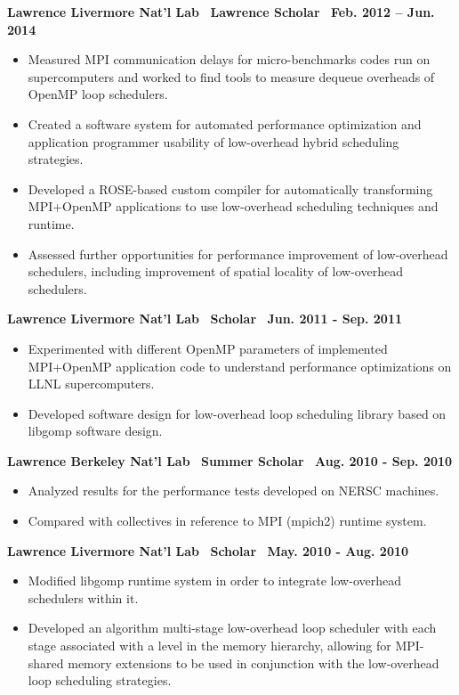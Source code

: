 \textbf{Lawrence Livermore Nat’l Lab$\>$$\>$$\>$$\>$Lawrence Scholar$\>$$\>$$\>$$\>$Feb. 2012 – Jun. 2014}
\vspace*{-0.0in}
\begin{itemize} 
\item Measured MPI communication delays for micro-benchmarks codes run on supercomputers and worked to find tools to measure dequeue overheads of OpenMP loop schedulers.
\item Created a software system for automated performance optimization and application programmer usability of low-overhead hybrid scheduling
strategies.
\item Developed a ROSE-based custom compiler for automatically transforming MPI+OpenMP applications to use low-overhead scheduling
techniques and runtime.
\item Assessed further opportunities for performance improvement of low-overhead schedulers, including improvement of spatial locality
of low-overhead schedulers.
\end{itemize}

\textbf{Lawrence Livermore Nat’l Lab$\>$$\>$$\>$$\>$Scholar$\>$$\>$$\>$$\>$Jun. 2011 - Sep. 2011}
\vspace*{-0.0in}
\begin{itemize} 
\item Experimented with different OpenMP parameters of implemented MPI+OpenMP application code to understand performance optimizations on
LLNL supercomputers.
\item Developed software design for low-overhead loop scheduling library based on libgomp software design.
\end{itemize} 

\textbf{Lawrence Berkeley Nat’l Lab$\>$$\>$$\>$$\>$Summer Scholar$\>$$\>$$\>$$\>$Aug. 2010 - Sep. 2010}
\begin{itemize}
\item Analyzed results for the performance tests developed on NERSC machines.
\item Compared with collectives in reference to MPI (mpich2) runtime system.
\end{itemize}

\textbf{Lawrence Livermore Nat’l Lab$\>$$\>$$\>$$\>$Scholar$\>$$\>$$\>$$\>$May. 2010 - Aug. 2010}
\begin{itemize}
\item Modified libgomp runtime system in order to integrate low-overhead schedulers within it.
\item Developed an algorithm multi-stage low-overhead loop scheduler with each stage associated with a level in the memory hierarchy, allowing for MPI-shared memory extensions to be used in conjunction with the low-overhead loop scheduling strategies.
\end{itemize}

